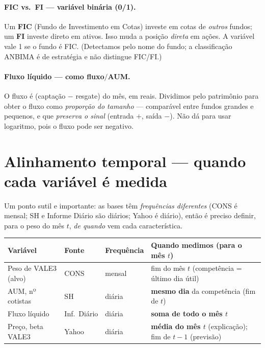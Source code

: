 \documentclass[11pt]{article}
\begin{document}
\paragraph{FIC vs.\ FI --- variável binária (0/1).} Um \textbf{FIC} (Fundo de
Investimento em Cotas) investe em cotas de \emph{outros} fundos; um \textbf{FI}
investe direto em ativos. Isso muda a posição \emph{direta} em ações. A variável vale
1 se o fundo é FIC. (Detectamos pelo nome do fundo; a classificação ANBIMA é de
estratégia e não distingue FIC/FI.)

\paragraph{Fluxo líquido --- como fluxo$/$AUM.} O fluxo é (captação $-$ resgate) do
mês, em reais. Dividimos pelo patrimônio para obter o fluxo como \emph{proporção do
tamanho} --- comparável entre fundos grandes e pequenos, e que \emph{preserva o
sinal} (entrada $+$, saída $-$). Não dá para usar logaritmo, pois o fluxo pode ser
negativo.

\section{Alinhamento temporal --- quando cada variável é medida}

Um ponto sutil e importante: as bases têm \emph{frequências diferentes} (CONS é mensal;
SH e Informe Diário são diários; Yahoo é diário), então é preciso definir, para o peso
do mês $t$, \emph{de quando} vem cada característica.

\begin{table}[h]\centering\small
\begin{tabular}{@{}llll@{}}
\toprule
Variável & Fonte & Frequência & Quando medimos (para o mês $t$) \\
\midrule
Peso de VALE3 (alvo) & CONS & mensal & fim do mês $t$ (competência = último dia útil) \\
AUM, nº cotistas     & SH   & diária & \textbf{mesmo dia} da competência (fim de $t$) \\
Fluxo líquido        & Inf.\ Diário & diária & \textbf{soma de todo o mês $t$} \\
Preço, beta VALE3    & Yahoo & diária & \textbf{média do mês $t$} (explicação); fim de $t-1$ (previsão) \\
\bottomrule
\end{tabular}
\end{table}
\end{document}
